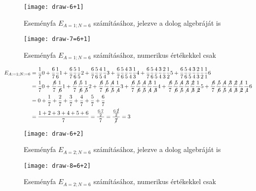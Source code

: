 \documentclass{article}
\begin{document}
	\begin{figure}[H]
		\caption*{Eseményfa $E_{A=1;N=6}$ számításához, jelezve a dolog algebráját is}
		\centering
		\texttt{[image: draw-6+1]}
	\end{figure}

	\begin{figure}[H]
		\caption*{Eseményfa $E_{A=1;N=6}$ számításához, numerikus értékekkel csak}
		\centering
		\texttt{[image: draw-7=6+1]}
	\end{figure}

	\begin{align*}
		E_{A:=1; N:=6} &= \frac{1}{7}0 + \frac{6}{7}\frac{1}{6}1 + \frac{6}{7}\frac{5}{6}\frac{1}{5}2 + \frac{6}{7}\frac{5}{6}\frac{4}{5}\frac{1}{4}3 + \frac{6}{7}\frac{5}{6}\frac{4}{5}\frac{3}{4}\frac{1}{3}4 + \frac{6}{7}\frac{5}{6}\frac{4}{5}\frac{3}{4}\frac{2}{3}\frac{1}{2}5 + \frac{6}{7}\frac{5}{6}\frac{4}{5}\frac{3}{4}\frac{2}{3}\frac{1}{2}\frac{1}{1}6\\
		  &= \frac{1}{7}0 + \frac{\not6}{7}\frac{1}{\not6}1 + \frac{\not6}{7}\frac{\not5}{\not6}\frac{1}{\not5}2 + \frac{\not6}{7}\frac{\not5}{\not6}\frac{\not4}{\not5}\frac{1}{\not4}3 + \frac{\not6}{7}\frac{\not5}{\not6}\frac{\not4}{\not5}\frac{\not3}{\not4}\frac{1}{\not3}4 + \frac{\not6}{7}\frac{\not5}{\not6}\frac{\not4}{\not5}\frac{\not3}{\not4}\frac{\not2}{\not3}\frac{1}{\not2}5 + \frac{\not6}{7}\frac{\not5}{\not6}\frac{\not4}{\not5}\frac{\not3}{\not4}\frac{\not2}{\not3}\frac{\not1}{\not2}\frac{1}{\not1}6\\
		  &= 0 + \frac17 + \frac27 + \frac37 + \frac47 + \frac57 + \frac67\\
		  &= \frac{1+2+3+4+5+6}7 = \frac{\frac{6\cdot7}2}7 = \frac{\frac{6\cdot\cancel7}2}{\cancel7} = 3
	\end{align*}

	\begin{figure}[H]
		\caption*{Eseményfa $E_{A=2;N=6}$ számításához, jelezve a dolog algebráját is}
		\centering
		\texttt{[image: draw-6+2]}
	\end{figure}

	\begin{figure}[H]
		\caption*{Eseményfa $E_{A=2;N=6}$ számításához, numerikus értékekkel csak}
		\centering
		\texttt{[image: draw-8=6+2]}
	\end{figure}
\end{document}
